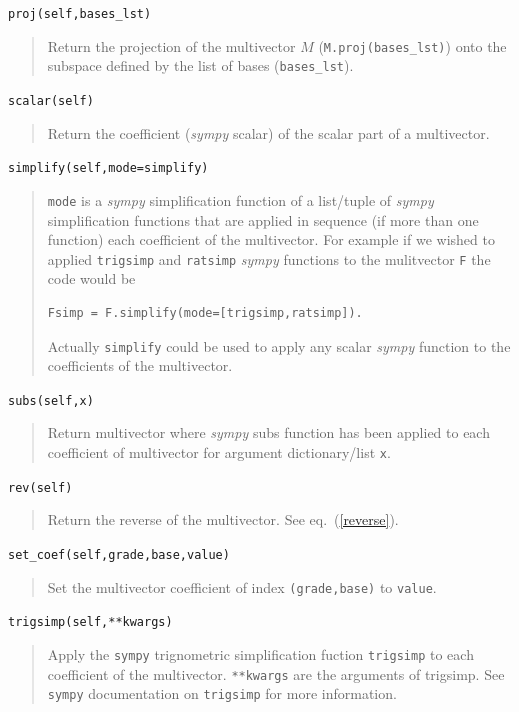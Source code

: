 \documentclass[12pt,twoside,openright]{memoir}
\newcommand{\T}[1]{\texttt{#1}}
\begin{document}
\T{proj(self,bases\_lst)}
\begin{quote}
   Return the projection of the multivector $M$ (\T{M.proj(bases\_lst)}) onto the subspace defined by the list of bases
   (\T{bases\_lst}).
\end{quote}

\T{scalar(self)}
\begin{quote}
    Return the coefficient (\emph{sympy} scalar) of the scalar part of a
    multivector.
\end{quote}

\T{simplify(self,mode=simplify)}
\begin{quote}
   \T{mode} is a \emph{sympy} simplification function of a list/tuple of \emph{sympy}
   simplification functions that are applied in sequence (if more than
   one function) each coefficient of the multivector.  For example if 
   we wished to applied \T{trigsimp} and \T{ratsimp} \emph{sympy} functions to the
   mulitvector \T{F} the code would be
   \begin{lstlisting}[numbers=none]
   Fsimp = F.simplify(mode=[trigsimp,ratsimp]).
   \end{lstlisting}
   
   Actually \T{simplify} could be used to apply any scalar \emph{sympy} function to
   the coefficients of the multivector.
\end{quote}

\T{subs(self,x)}
\begin{quote}
   Return multivector where \emph{sympy} subs function has been applied to each
   coefficient of multivector for argument dictionary/list \T{x}.
\end{quote}

\T{rev(self)}
\begin{quote}
   Return the reverse of the multivector.  See eq.~(\ref{reverse}).
\end{quote}

\T{set\_coef(self,grade,base,value)}
\begin{quote}
   Set the multivector coefficient of index \T{(grade,base)} to \T{value}.
\end{quote}

\T{trigsimp(self,**kwargs)}
\begin{quote}
   Apply the \T{sympy} trignometric simplification fuction \T{trigsimp} to
   each coefficient of the multivector. \T{**kwargs} are the arguments of
   trigsimp.  See \T{sympy} documentation on \T{trigsimp} for more information.
\end{quote}
\end{document}
